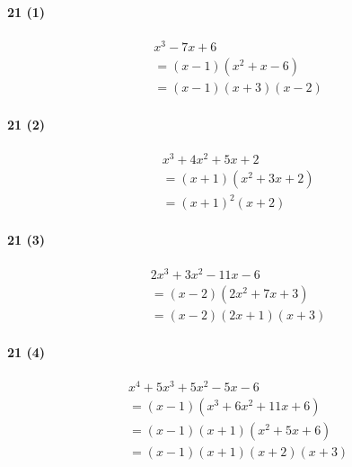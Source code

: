 \documentclass[fleqn,a4j,dvipdfmx,uplatex,twocolumn]{jsarticle}
\begin{document}
\paragraph{21 (1)}
\begin{align*}
  &x^3 - 7x + 6 \\
  &= (x - 1)(x^2 + x - 6) \\
  &= (x - 1)(x + 3)(x - 2)
\end{align*}

\paragraph{21 (2)}
\begin{align*}
  &x^3 + 4x^2 + 5x + 2 \\
  &= (x + 1)(x^2 + 3x + 2) \\
  &= (x + 1)^2(x + 2)
\end{align*}

\paragraph{21 (3)}
\begin{align*}
  &2x^3 + 3x^2 - 11x - 6 \\
  &= (x - 2)(2x^2 + 7x + 3) \\
  &= (x - 2)(2x + 1)(x + 3)
\end{align*}

\paragraph{21 (4)}
\begin{align*}
  &x^4 + 5x^3 + 5x^2 - 5x - 6 \\
  &= (x - 1)(x^3 + 6x^2 + 11x + 6) \\
  &= (x - 1)(x + 1)(x^2 + 5x + 6) \\
  &= (x - 1)(x + 1)(x + 2)(x + 3)
\end{align*}
\end{document}
